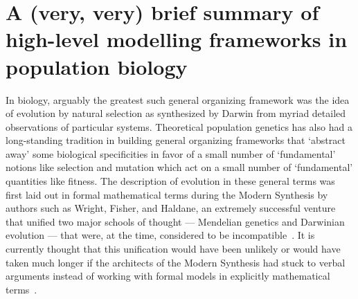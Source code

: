 \section{A (very, very) brief summary of high-level modelling frameworks in population biology}\label{sec_history}

In biology, arguably the greatest such general organizing framework was the idea of evolution by natural selection as synthesized by Darwin from myriad detailed observations of particular systems. Theoretical population genetics has also had a long-standing tradition in building general organizing frameworks that `abstract away' some biological specificities in favor of a small number of `fundamental' notions like selection and mutation which act on a small number of `fundamental' quantities like fitness. The description of evolution in these general terms was first laid out in formal mathematical terms during the Modern Synthesis by authors such as Wright, Fisher, and Haldane, an extremely successful venture that unified two major schools of thought --- Mendelian genetics and Darwinian evolution --- that were, at the time, considered to be incompatible~\citep{provine_origins_2001}. It is currently thought that this unification would have been unlikely or would have taken much longer if the architects of the Modern Synthesis had stuck to verbal arguments instead of working with formal models in explicitly mathematical terms~\citep{walsh_darwins_2014}. 

